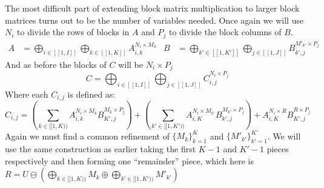 The most difficult part of extending block matrix multiplication to larger block matrices turns out to be the number of 
variables needed.
Once again we will use $N_i$ to divide the rows of blocks in $A$ and $P_j$ to divide the block columns of $B$.
\begin{align*}
	A &= \bigoplus_{i \in [\![1,I]\!]} \bigoplus_{k \in [\![1,K]\!]} A_{i,k}^{N_i \times M_k}&
	B &= \bigoplus_{k' \in [\![1,K']\!]} \bigoplus_{j \in [\![1,J]\!]} B_{k',j}^{M'_{k'} \times P_j}
\end{align*}
And as before the blocks of $C$ will be $N_i \times P_j$
\begin{equation}
	C = \bigoplus_{i \in [\![1,I]\!]} \bigoplus_{j \in [\![1,J]\!]} C_{i,j}^{N_i \times P_j}
\end{equation}
Where each $C_{i,j}$ is defined as:
\begin{equation}
	C_{i,j} = 	\left(\sum_{k \in [\![1,K)\!)} A_{i,k}^{N_i \times M_k} B_{K',j}^{M_k \times P_j} \right)+ 
				\left(\sum_{k' \in [\![1,K')\!)} A_{i,K}^{N_i \times M_{k'}} B_{k',j}^{M_{k'} \times P_j} \right)+ 
				A_{i,K}^{N_i \times R} B_{K',j}^{R \times P_j}
\end{equation}
Again we must find a common refinement of $\{M_k\}_{k=1}^K$ and $\{M'_{k'}\}_{k'=1}^{K'}$.
We will use the same construction as earlier taking the first $K-1$ and $K'-1$ pieces respectively and then forming one 
``remainder'' piece, which here is 
$R =U \ominus \left( \bigoplus_{k \in [\![1,K)\!)} M_k \oplus \bigoplus_{k' \in [\![1,K')\!)} M'_{k'}\right)$







